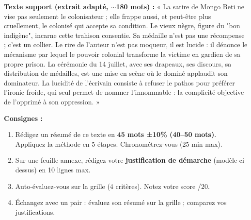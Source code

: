 \documentclass[11pt]{article}
\begin{document}
\begin{exercice}
\textbf{Texte support (extrait adapté, $\sim$180 mots) :}
« La satire de Mongo Beti ne vise pas seulement le colonisateur ; elle frappe aussi, et peut-être plus cruellement, le colonisé qui accepte sa condition. Le vieux nègre, figure du "bon indigène", incarne cette trahison consentie. Sa médaille n'est pas une récompense ; c'est un collier. Le rire de l'auteur n'est pas moqueur, il est lucide : il dénonce le mécanisme par lequel le pouvoir colonial transforme la victime en gardien de sa propre prison. La cérémonie du 14 juillet, avec ses drapeaux, ses discours, sa distribution de médailles, est une mise en scène où le dominé applaudit son dominateur. La lucidité de l'écrivain consiste à refuser le pathos pour préférer l'ironie froide, qui seul permet de nommer l'innommable : la complicité objective de l'opprimé à son oppression. »

\textbf{Consignes :}
\begin{enumerate}
\item Rédigez un résumé de ce texte en \textbf{45 mots ±10\% (40--50 mots)}. Appliquez la méthode en 5 étapes. Chronométrez-vous (25 min max).
\item Sur une feuille annexe, rédigez votre \textbf{justification de démarche} (modèle ci-dessus) en 10 lignes max.
\item Auto-évaluez-vous sur la grille (4 critères). Notez votre score /20.
\item Échangez avec un pair : évaluez son résumé sur la grille ; comparez vos justifications.
\end{enumerate}
\end{exercice}
\end{document}
